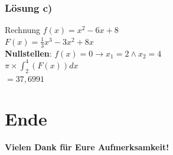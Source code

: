 \documentclass{beamer}
\begin{document}
	\begin{frame}
		\frametitle{Lösung c)}
		\begin{block}{Rechnung}
			$f(x) = x^2 - 6x + 8$ \\
			$F(x) = \frac{1}{3}x^3 - 3x^2 + 8x$ \\
			\textbf{Nullstellen}: $f(x) = 0 \to x_1 = 2 \land x_2 = 4$ \\
			$\pi \times \int_{2}^{4}(F(x)) dx$ \\
			$= 37,6991$
		\end{block}
	\end{frame}
	
	\section{Ende}
	\begin{frame}
		\centering
		\Huge{
			\textbf{Vielen Dank für Eure Aufmerksamkeit!}
		}
	\end{frame}
\end{document}
